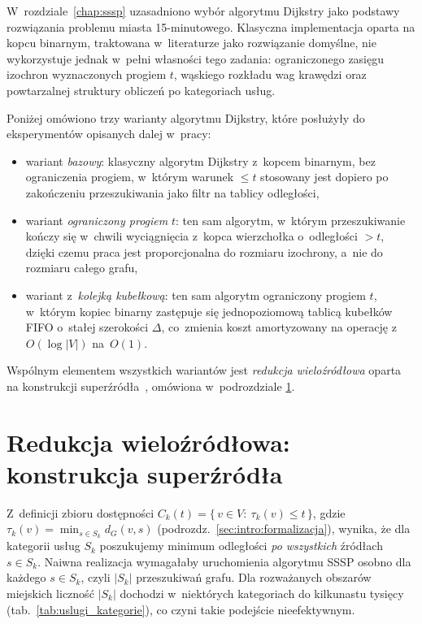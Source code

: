 \label{chap:warianty-dijkstry}

W~rozdziale~\ref{chap:sssp} uzasadniono wybór algorytmu Dijkstry jako podstawy
rozwiązania problemu miasta 15-minutowego. Klasyczna implementacja oparta na kopcu
binarnym, traktowana w~literaturze jako rozwiązanie domyślne, nie wykorzystuje
jednak w~pełni własności tego zadania: ograniczonego zasięgu izochron
wyznaczonych progiem $t$, wąskiego rozkładu wag krawędzi oraz powtarzalnej
struktury obliczeń po kategoriach usług.

Poniżej omówiono trzy warianty algorytmu Dijkstry, które posłużyły
do eksperymentów opisanych dalej w~pracy:
\begin{itemize}
  \item wariant \emph{bazowy}: klasyczny algorytm Dijkstry
        z~kopcem binarnym, bez ograniczenia progiem, w~którym warunek
        $\le t$ stosowany jest dopiero po zakończeniu przeszukiwania
        jako filtr na tablicy odległości,
  \item wariant \emph{ograniczony progiem} $t$: ten sam algorytm,
        w~którym przeszukiwanie kończy się w~chwili wyciągnięcia z~kopca
        wierzchołka o~odległości $>t$, dzięki czemu praca jest proporcjonalna
        do rozmiaru izochrony, a~nie do rozmiaru całego grafu,
  \item wariant z~\emph{kolejką kubełkową}: ten sam algorytm
        ograniczony progiem $t$, w~którym kopiec binarny zastępuje się
        jednopoziomową tablicą kubełków FIFO o~stałej szerokości $\Delta$,
        co~zmienia koszt amortyzowany na operację z~$O(\log|V|)$ na~$O(1)$.
\end{itemize}
Wspólnym elementem wszystkich wariantów jest \emph{redukcja wieloźródłowa}
oparta na konstrukcji superźródła~\cite{Lam2024}, omówiona w~podrozdziale
\ref{sec:warianty:supersource}.

\section{Redukcja wieloźródłowa: konstrukcja superźródła}
\label{sec:warianty:supersource}

Z~definicji zbioru dostępności
$C_k(t)=\{\,v\in V:\ \tau_k(v)\le t\,\}$,
gdzie $\tau_k(v)=\min_{s\in S_k} d_G(v,s)$
(podrozdz.~\ref{sec:intro:formalizacja}),
wynika, że dla kategorii usług $S_k$ poszukujemy minimum odległości
\emph{po wszystkich} źródłach $s\in S_k$. Naiwna realizacja wymagałaby
uruchomienia algorytmu SSSP osobno dla każdego $s\in S_k$, czyli $|S_k|$
przeszukiwań grafu. Dla rozważanych obszarów miejskich
liczność $|S_k|$ dochodzi w~niektórych kategoriach do kilkunastu tysięcy
(tab.~\ref{tab:uslugi_kategorie}), co czyni takie podejście nieefektywnym.

